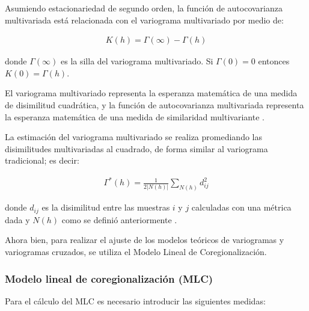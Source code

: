 \documentclass[
]{book}
\begin{document}
Asumiendo estacionariedad de segundo orden, la función de autocovarianza multivariada está relacionada con el variograma multivariado por medio de:

\begin{align*}
    K(h)=\Gamma(\infty)-\Gamma(h)
\end{align*}

donde \(\Gamma(\infty)\) es la silla del variograma multivariado. Si \(\Gamma(0)=0\) entonces \(K(0)=\Gamma(h)\).

El variograma multivariado representa la esperanza matemática de una medida de disimilitud cuadrática, y la función de autocovarianza multivariada representa la esperanza matemática de una medida de similaridad multivariante \citep{borou}.

La estimación del variograma multivariado se realiza promediando las disimilitudes multivariadas al cuadrado, de forma similar al variograma tradicional; es decir:

\begin{align*}
    \Gamma^*(h)=\frac{1}{2|N(h)|}\sum_{N(h)}d_{ij}^2
\end{align*}

donde \(d_{ij}\) es la disimilitud entre las muestras \(i\) y \(j\) calculadas con una métrica dada y \(N(h)\) como se definió anteriormente \citep{borou}.

Ahora bien, para realizar el ajuste de los modelos teóricos de variogramas y variogramas cruzados, se utiliza el Modelo Lineal de Coregionalización.

\hypertarget{modelo-lineal-de-coregionalizaciuxf3n-mlc}{%
\subsubsection*{Modelo lineal de coregionalización (MLC)}\label{modelo-lineal-de-coregionalizaciuxf3n-mlc}}

Para el cálculo del MLC es necesario introducir las siguientes medidas:
\end{document}

